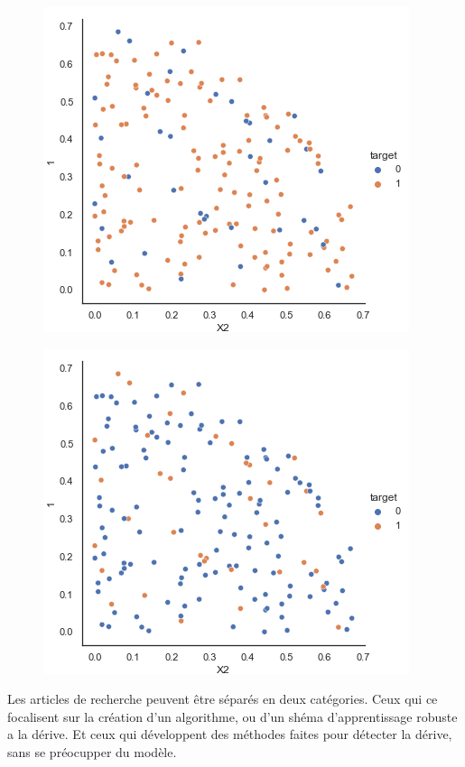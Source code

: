 \documentclass[11pt,a4paper]{report}
\begin{document}
\begin{figure}
\centering
\begin{minipage}{.5\textwidth}
  \centering
  \includegraphics[width=0.7\linewidth]{P_x_before.png}
  \label{fig:test1}
\end{minipage}%
\begin{minipage}{.5\textwidth}
  \centering
  \includegraphics[width=0.7\linewidth]{P_x_later.png}
  \label{fig:test2}
\end{minipage}
\end{figure}


\newpage

Les articles de recherche peuvent être séparés en deux catégories. Ceux qui ce focalisent sur la création d'un algorithme, ou d'un shéma d'apprentissage robuste a la dérive. Et ceux qui développent des méthodes faites pour détecter la dérive, sans se préocupper du modèle.
\end{document}
